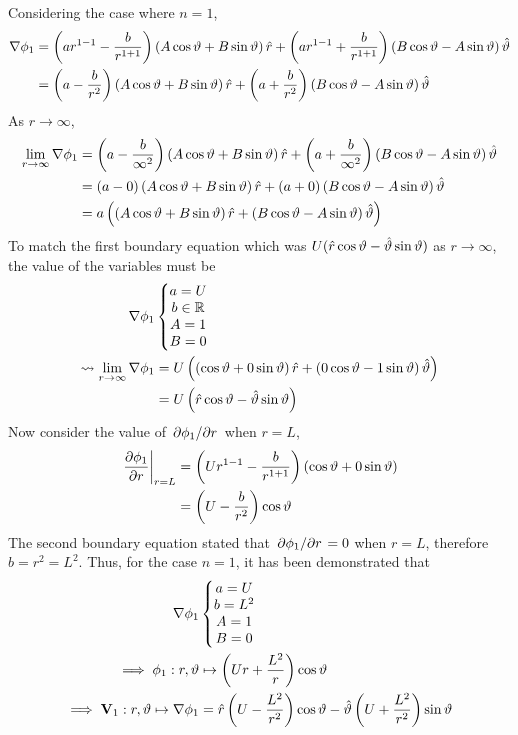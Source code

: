 Considering the case where $n=1$,
\begin{align*}
    \nabla\phi_1&=\left(ar^{1-1}-\frac{b}{r^{1+1}}\right)\left(A\cos\vartheta+B\sin\vartheta\right)\hat{r}+\left(ar^{1-1}+\frac{b}{r^{1+1}}\right)\left(B\cos\vartheta-A\sin\vartheta\right)\hat{\vartheta}\\
    &=\left(a-\frac{b}{r^{2}}\right)\left(A\cos\vartheta+B\sin\vartheta\right)\hat{r}+\left(a+\frac{b}{r^{2}}\right)\left(B\cos\vartheta-A\sin\vartheta\right)\hat{\vartheta}
\end{align*}
As $r\rightarrow\infty$,
\begin{align*}
    \lim_{r\rightarrow\infty}\nabla\phi_1&=\left(a-\frac{b}{\infty^2}\right)\left(A\cos\vartheta+B\sin\vartheta\right)\hat{r}+\left(a+\frac{b}{\infty^2}\right)\left(B\cos\vartheta-A\sin\vartheta\right)\hat{\vartheta}\\
    &=\left(a-0\right)\left(A\cos\vartheta+B\sin\vartheta\right)\hat{r}+\left(a+0\right)\left(B\cos\vartheta-A\sin\vartheta\right)\hat{\vartheta}\\
    &=a\left(\left(A\cos\vartheta+B\sin\vartheta\right)\hat{r}+\left(B\cos\vartheta-A\sin\vartheta\right)\hat{\vartheta}\right)
\end{align*}
To match the first boundary equation which was $U(\hat{r}\cos\vartheta-\hat{\vartheta}\sin\vartheta)$ as $r\rightarrow\infty$, the value of the variables must be
\begin{align*}
    \nabla\phi_1&\left\{\begin{matrix}
        a=U\\
        b\in\mathbb{R}\\
        A=1\\
        B=0
    \end{matrix}\right.\\
    \leadsto\lim_{r\rightarrow\infty}\nabla\phi_1&=U\left(\left(\cos\vartheta+0\sin\vartheta\right)\hat{r}+\left(0\cos\vartheta-1\sin\vartheta\right)\hat{\vartheta}\right)\\
    &=U\left(\hat{r}\cos\vartheta-\hat{\vartheta}\sin\vartheta\right)
\end{align*}
Now consider the value of $\pdv*{\phi_1}{r}$ when $r=L$,
\begin{align*}
    \eval{\pdv{\phi_1}{r}}_{r=L}&=\left(Ur^{1-1}-\frac{b}{r^{1+1}}\right)\left(\cos\theta+0\sin\theta\right)\\
    &=\left(U-\frac{b}{r^{2}}\right)\cos\theta
\end{align*}
The second boundary equation stated that $\pdv*{\phi_1}{r}=0$ when $r=L$, therefore $b=r^2=L^2$. Thus, for the case $n=1$, it has been demonstrated that
\begin{align*}
    \nabla\phi_1&\left\{\begin{matrix}
        a=U\\
        b=L^2\\
        A=1\\
        B=0
    \end{matrix}\right.\\
    \implies\phi_1:r,\vartheta&\mapsto\left(Ur+\frac{L^2}{r}\right)\cos\vartheta\\
    \implies\mathbf{V}_1:r,\vartheta\mapsto\nabla\phi_1&=\hat{r}\left(U-\frac{L^2}{r^{2}}\right)\cos\vartheta-\hat{\vartheta}\left(U+\frac{L^2}{r^{2}}\right)\sin\vartheta
\end{align*}
